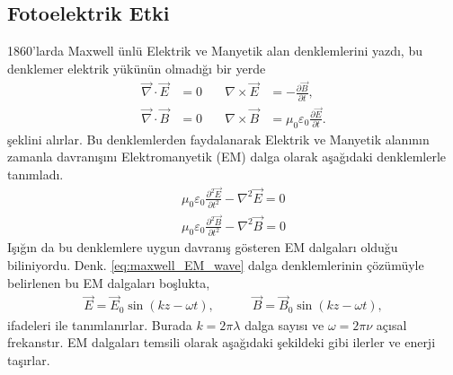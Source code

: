 \documentclass[a4paper,12pt, twoside]{article}
\begin{document}




\subsection{Fotoelektrik Etki}

1860'larda Maxwell ünlü Elektrik ve Manyetik alan denklemlerini yazdı, bu denklemer elektrik yükünün olmadığı bir yerde 
\begin{align}
\label{eq:maxwell}
  \vec \nabla \cdot \vec{E} &= 0 \quad & \nabla \times \vec{E} &=              -\frac{\partial\vec B}{\partial t}, \\
    \vec \nabla \cdot \vec{B} &= 0 \quad & \nabla \times \vec{B} &= \mu_0\varepsilon_0 \frac{\partial\vec E}{\partial t}.
\end{align}
şeklini alırlar. Bu denklemlerden faydalanarak Elektrik ve Manyetik alanının zamanla davranışını Elektromanyetik (EM) dalga olarak aşağıdaki denklemlerle tanımladı. 
\begin{align}
\label{eq:maxwell_EM_wave}
  \mu_0\varepsilon_0  \frac{\partial^2   \vec{E}}{\partial t^2} - \nabla^2   \vec{E} = 0 \\
  \mu_0\varepsilon_0 \frac{\partial^2   \vec{B}}{\partial t^2} - \nabla^2 \vec{B} = 0
\end{align}
Işığın da bu denklemlere uygun davranış gösteren EM dalgaları olduğu biliniyordu. Denk. \ref{eq:maxwell_EM_wave} dalga denklemlerinin çözümüyle belirlenen bu EM dalgaları boşlukta, 
\begin{align}
\label{eq:EM_waves}
\vec E = \vec E_0 \sin(kz-\omega t),\hspace{36pt} \vec B = \vec B_0 \sin(kz-\omega t), 
\end{align}
ifadeleri ile tanımlanırlar. Burada $k=2\pi\lambda$ dalga sayısı ve $\omega=2\pi\nu$ açısal frekanstır. EM dalgaları temsili olarak aşağıdaki şekildeki gibi ilerler ve enerji taşırlar.
\end{document}

